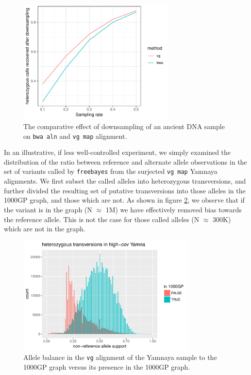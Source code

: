 \documentclass[a4paper,12pt,numbered,oneside]{Classes/PhDThesisPSnPDF}
\begin{document}
\begin{figure}[htbp!]
  \centering
  \includegraphics[width=0.7\textwidth]{Chapter3/Figs/aDNA_downsampling.pdf}
  \caption[Downsampling a high-coverage aDNA sample]{
    The comparative effect of downsampling of an ancient DNA sample on {\tt bwa aln} and {\tt vg map} alignment.
  }
  \label{fig:aDNA_downsampling}
\end{figure}

In an illustrative, if less well-controlled experiment, we simply examined the distribution of the ratio between reference and alternate allele observations in the set of variants called by {\tt freebayes} from the surjected {\tt vg map} Yamnaya alignments.
We first subset the called alleles into heterozygous transversions, and further divided the resulting set of putative transversions into those alleles in the 1000GP graph, and those which are not.
As shown in figure \ref{fig:yamnaya_het_violins}, we observe that if the variant is in the graph (N $\approx$ 1M) we have effectively removed bias towards the reference allele.
This is not the case for those called alleles (N $\approx$ 300K) which are not in the graph.


\begin{figure}[htbp!]
  \centering
  \includegraphics[width=0.8\textwidth]{Chapter3/Figs/yamna_1000GP_AB_het_hist.pdf}
  \caption[Allele balance in the Yamnaya sample]{
    Allele balance in the {\tt vg} alignment of the Yamnaya sample to the 1000GP graph versus its presence in the 1000GP graph.
  }
  \label{fig:yamnaya_het_violins}
\end{figure}
\end{document}
